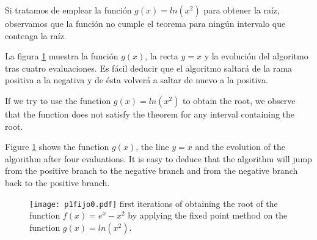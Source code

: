 \begin{paracol}{2}
    
Si tratamos de emplear la función $g(x)=ln(x^2)$ para obtener la raíz, observamos que la función no cumple el teorema para ningún intervalo que contenga la raíz. 

La figura \ref{fig:pfijo03} muestra la función $g(x)$, la recta $y=x$ y la evolución del algoritmo tras cuatro evaluaciones. Es fácil deducir que el algoritmo saltará de la rama positiva a la negativa y de ésta volverá a saltar de nuevo a la positiva. 

\switchcolumn

If we try to use the function $g(x)=ln(x^2)$ to obtain the root, we observe that the function does not satisfy the theorem for any interval containing the root. 

Figure \ref{fig:pfijo03} shows the function $g(x)$, the line $y=x$ and the evolution of the algorithm after four evaluations. It is easy to deduce that the algorithm will jump from the positive branch to the negative branch and from the negative branch back to the positive branch.

\end{paracol}

\begin{figure}[h]
\texttt{[image: p1fijo0.pdf]}
 {first iterations of obtaining the root of the function $f(x)=e^x-x^2$ by applying the fixed point method on the function $g(x)=ln(x^2)$.}
\label{fig:pfijo03}
\end{figure}

